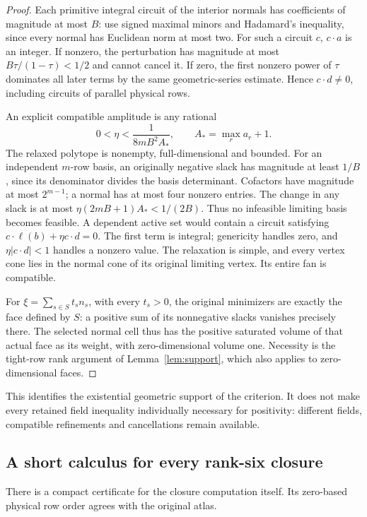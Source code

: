 \begin{proof}
Each primitive integral circuit of the interior normals has coefficients
of magnitude at most \(B\): use signed maximal minors and Hadamard's
inequality, since every normal has Euclidean norm at most two. For such a
circuit \(c\), \(c\cdot a\) is an integer. If nonzero, the perturbation
has magnitude at most \(B\tau/(1-\tau)<1/2\) and cannot cancel it.
If zero, the first nonzero power of \(\tau\) dominates all later terms by
the same geometric-series estimate. Hence \(c\cdot d\ne0\), including
circuits of parallel physical rows.

An explicit compatible amplitude is any rational
\[
0<\eta<\frac{1}{8mB^2A_*},\qquad A_* =\max_r a_r+1.
\]
The relaxed polytope is nonempty, full-dimensional and bounded. For an
independent \(m\)-row basis, an originally negative slack has magnitude
at least \(1/B\), since its denominator divides the basis determinant.
Cofactors have magnitude at most \(2^{m-1}\); a normal has at most four
nonzero entries. The change in any slack is at most
\(\eta(2mB+1)A_*<1/(2B)\). Thus no infeasible limiting basis becomes
feasible. A dependent active set would contain a circuit satisfying
\(c\cdot\ell(b)+\eta c\cdot d=0\). The first term is integral;
genericity handles zero, and \(\eta|c\cdot d|<1\) handles a nonzero value.
The relaxation is simple, and every vertex cone lies in the normal cone
of its original limiting vertex. Its entire fan is compatible.

For \(\xi=\sum_{s\in S}t_sn_s\), with every \(t_s>0\), the original
minimizers are exactly the face defined by \(S\): a positive sum of its
nonnegative slacks vanishes precisely there. The selected normal cell thus
has the positive saturated volume of that actual face as its weight, with
zero-dimensional volume one. Necessity is the tight-row rank argument of
Lemma~\ref{lem:support}, which also applies to zero-dimensional faces.
\end{proof}

This identifies the existential geometric support of the criterion.
It does not make every retained field inequality individually necessary for
positivity: different fields, compatible refinements and cancellations remain
available.

\subsection{A short calculus for every rank-six closure}\label{sec:closure-calculus}
There is a compact certificate for the closure computation itself. Its
zero-based physical row order agrees with the original atlas.

